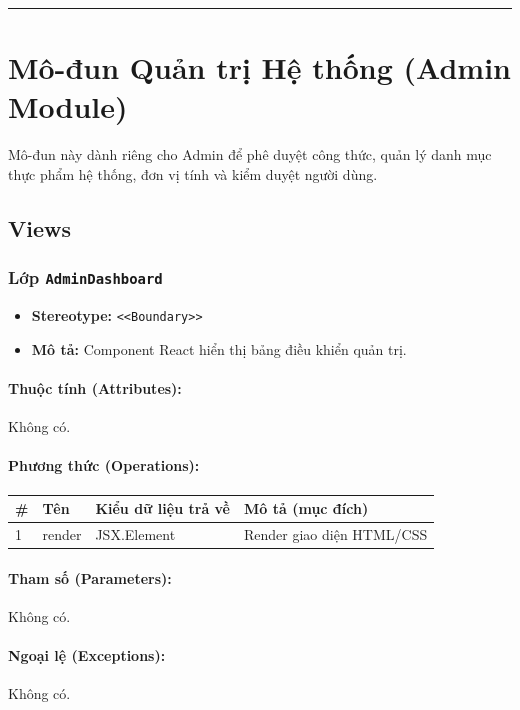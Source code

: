 \documentclass[12pt,a4paper]{article}
\begin{document}
\vskip 0.5cm
\noindent\rule{\textwidth}{0.5pt}
\vskip 0.5cm

\section{Mô-đun Quản trị Hệ thống (Admin Module)}


Mô-đun này dành riêng cho Admin để phê duyệt công thức, quản lý danh mục thực phẩm hệ thống, đơn vị tính và kiểm duyệt người dùng.

\subsection{Views}


\subsubsection{Lớp \texttt{AdminDashboard}}

\begin{itemize}[leftmargin=*]
    \item \textbf{Stereotype:} \texttt{\textless{}\textless{}Boundary\textgreater{}\textgreater{}}
    \item \textbf{Mô tả:} Component React hiển thị bảng điều khiển quản trị.
\end{itemize}

\paragraph{Thuộc tính (Attributes):}
Không có.

\paragraph{Phương thức (Operations):}
\begin{longtable}{|p{0.6cm}|p{5.0cm}|p{2.8cm}|p{5.4cm}|}
\hline
\textbf{\#} & \textbf{Tên} & \textbf{Kiểu dữ liệu trả về} & \textbf{Mô tả (mục đích)} \\ \hline
\endhead
1 & render & JSX.Element & Render giao diện HTML/CSS \\ \hline
\end{longtable}

\paragraph{Tham số (Parameters):}
Không có.

\paragraph{Ngoại lệ (Exceptions):}
Không có.
\end{document}
